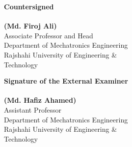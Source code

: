 \vspace{0.8cm}

\noindent
\begin{minipage}[t]{0.46\textwidth}
  \textbf{Countersigned}\\[1.5cm]
  \signatureline[6cm]\\[0.15cm]
  \textbf{(Md. Firoj Ali)}\\
  Associate Professor and Head\\
  Department of Mechatronics Engineering\\
  Rajshahi University of Engineering \&\\
  Technology
\end{minipage}
\hfill
\begin{minipage}[t]{0.46\textwidth}
  \textbf{Signature of the External Examiner}\\[1.5cm]
  \signatureline[6cm]\\[0.15cm]
  \textbf{(Md. Hafiz Ahamed)}\\
  Assistant Professor\\
  Department of Mechatronics Engineering\\
  Rajshahi University of Engineering \&\\
  Technology
\end{minipage}

\clearpage
